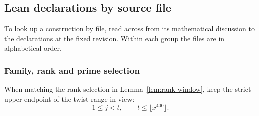 \subsection{Lean declarations by source file}
\label{sec:additional-concordance}

To look up a construction by file, read across from its mathematical discussion to the
declarations at the fixed revision.
Within each group the files are in alphabetical order. \cite{release}

\subsubsection{Family, rank and prime selection}
When matching the rank selection in Lemma~\ref{lem:rank-window}, keep the strict upper
endpoint of the twist range in view:
\[
 1\le j<t,\qquad t\le\lfloor x^{400}\rfloor.
\]
